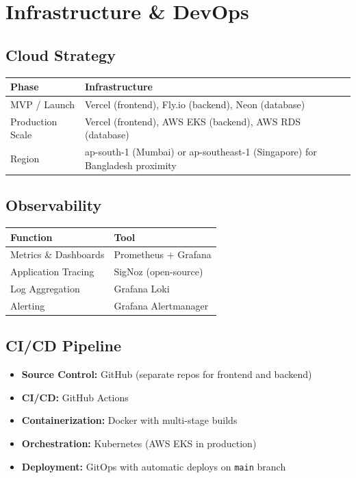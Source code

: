 \documentclass[11pt,a4paper]{article}
\begin{document}
\section{Infrastructure \& DevOps}

\subsection{Cloud Strategy}

\begin{tabular}{@{}p{4cm}p{9cm}@{}}
\toprule
\textbf{Phase} & \textbf{Infrastructure} \\
\midrule
MVP / Launch & Vercel (frontend), Fly.io (backend), Neon (database) \\
\addlinespace
Production Scale & Vercel (frontend), AWS EKS (backend), AWS RDS (database) \\
\addlinespace
Region & ap-south-1 (Mumbai) or ap-southeast-1 (Singapore) for Bangladesh proximity \\
\bottomrule
\end{tabular}

\subsection{Observability}

\begin{tabular}{@{}p{4cm}p{9cm}@{}}
\toprule
\textbf{Function} & \textbf{Tool} \\
\midrule
Metrics \& Dashboards & Prometheus + Grafana \\
Application Tracing & SigNoz (open-source) \\
Log Aggregation & Grafana Loki \\
Alerting & Grafana Alertmanager \\
\bottomrule
\end{tabular}

\subsection{CI/CD Pipeline}

\begin{itemize}
    \item \textbf{Source Control:} GitHub (separate repos for frontend and backend)
    \item \textbf{CI/CD:} GitHub Actions
    \item \textbf{Containerization:} Docker with multi-stage builds
    \item \textbf{Orchestration:} Kubernetes (AWS EKS in production)
    \item \textbf{Deployment:} GitOps with automatic deploys on \texttt{main} branch
\end{itemize}
\end{document}
